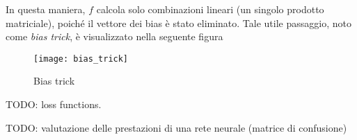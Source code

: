In questa maniera, $f$ calcola solo combinazioni lineari (un singolo prodotto matriciale), poiché il vettore dei bias è stato eliminato.
Tale utile passaggio, noto come \textit{bias trick}, è visualizzato nella seguente figura

\begin{figure}[h]
\centering
\texttt{[image: bias\_trick]}
\caption{Bias trick}
\label{bias_trick}
\end{figure}

TODO: loss functions.

TODO: valutazione delle prestazioni di una rete neurale (matrice di confusione)